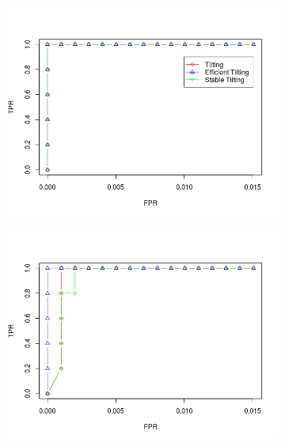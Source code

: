 \documentclass[11pt]{report}\usepackage[utf8]{inputenc}
\begin{document}
\begin{figure}[h]
    \centering
    \begin{subfigure}[b]{0.3\textwidth}
        \includegraphics[width=\textwidth]{../plots/general09}
        \caption{}
    \end{subfigure}
    \begin{subfigure}[b]{0.3\textwidth}
        \includegraphics[width=\textwidth]{../plots/general06}
        \caption{}
    \end{subfigure}
    \begin{subfigure}[b]{0.3\textwidth}

\end{subfigure}
\end{figure}
\end{document}
